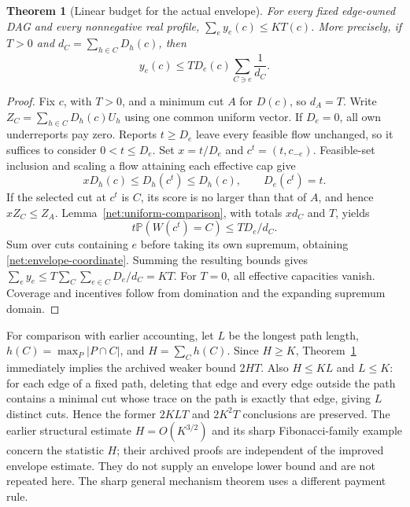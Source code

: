 \documentclass[11pt]{article}
\newtheorem{theorem}{Theorem}[section]
\theoremstyle{definition}\newtheorem{definition}[theorem]{Definition}
\theoremstyle{remark}\newtheorem{remark}[theorem]{Remark}
\newcommand{\Prob}{\mathbb P}
\begin{document}
\begin{theorem}[Linear budget for the actual envelope]\label{net:envelope-upper}
For every fixed edge-owned DAG and every nonnegative real profile,
$\sum_ey_e(c)\le KT(c)$.  More precisely, if $T>0$ and
$d_C=\sum_{h\in C}D_h(c)$, then
\begin{equation}\label{net:envelope-coordinate}
 y_e(c)\le T D_e(c)\sum_{C\ni e}\frac1{d_C}.
\end{equation}
\end{theorem}
\begin{proof}
Fix $c$, with $T>0$, and a minimum cut $A$ for $D(c)$, so $d_A=T$.
Write $Z_C=\sum_{h\in C}D_h(c)U_h$ using one common uniform vector.
If $D_e=0$, all own underreports pay zero.
Reports $t\ge D_e$ leave every feasible flow unchanged, so it suffices to
consider $0<t\le D_e$.  Set $x=t/D_e$ and $c^t=(t,c_{-e})$.
Feasible-set inclusion and scaling a flow attaining each effective cap give
\[
 xD_h(c)\le D_h(c^t)\le D_h(c),\qquad D_e(c^t)=t.
\]
If the selected cut at $c^t$ is $C$, its score is no larger than that of $A$,
and hence $xZ_C\le Z_A$.  Lemma~\ref{net:uniform-comparison}, with totals
$xd_C$ and $T$, yields
\[
 t\Prob(W(c^t)=C)\le TD_e/d_C.
\]
Sum over cuts containing $e$ before taking its own supremum, obtaining
\eqref{net:envelope-coordinate}.  Summing the resulting bounds gives
$\sum_ey_e\le T\sum_C\sum_{e\in C}D_e/d_C=KT$.
For $T=0$, all effective capacities vanish.  Coverage and incentives follow
from domination and the expanding supremum domain.
\end{proof}
For comparison with earlier accounting, let $L$ be the longest path length,
$h(C)=\max_P|P\cap C|$, and $H=\sum_Ch(C)$.
Since $H\ge K$, Theorem~\ref{net:envelope-upper} immediately implies the
archived weaker bound $2HT$.  Also $H\le KL$ and $L\le K$: for each edge
of a fixed path, deleting that edge and every edge outside the path contains
a minimal cut whose trace on the path is exactly that edge, giving $L$
distinct cuts.  Hence the former $2KLT$ and $2K^2T$ conclusions are preserved.
The earlier structural estimate $H=O(K^{3/2})$ and its sharp Fibonacci-family
example concern the statistic $H$; their archived proofs are independent
of the improved envelope estimate.  They do not supply an envelope lower
bound and are not repeated here.  The sharp general mechanism theorem uses
a different payment rule.
\end{document}
